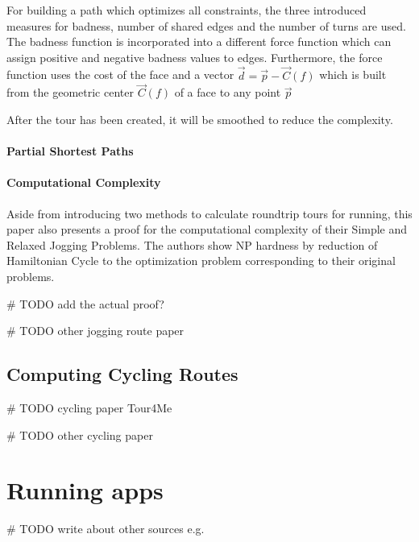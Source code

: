 For building a path which optimizes all constraints, the three introduced measures for badness, number of shared edges and the number of turns are used.
The badness function is incorporated into a different force function which can assign positive and negative badness values to edges.
Furthermore, the force function uses the cost of the face and a vector $\vec{d} = \vec{p} - \vec{C}(f)$ which is built from the geometric center $\vec{C}(f)$ of a face to any point $\vec{p}$
 


After the tour has been created, it will be smoothed to reduce the complexity.


\paragraph{Partial Shortest Paths}





\paragraph{Computational Complexity}

Aside from introducing two methods to calculate roundtrip tours for running, this paper also presents a proof for the computational complexity of their Simple and Relaxed Jogging Problems.
The authors show NP hardness by reduction of Hamiltonian Cycle to the optimization problem corresponding to their original problems.

 \# TODO add the actual proof?

\# TODO other jogging route paper







\subsection{Computing Cycling Routes}
\label{subsec:cyclingRoutes}
\# TODO cycling paper Tour4Me

\# TODO other cycling paper





\section{Running apps}
\label{sec:runningApps}

\# TODO write about other sources e.g. \cite{loepp_recommending_nodate}



